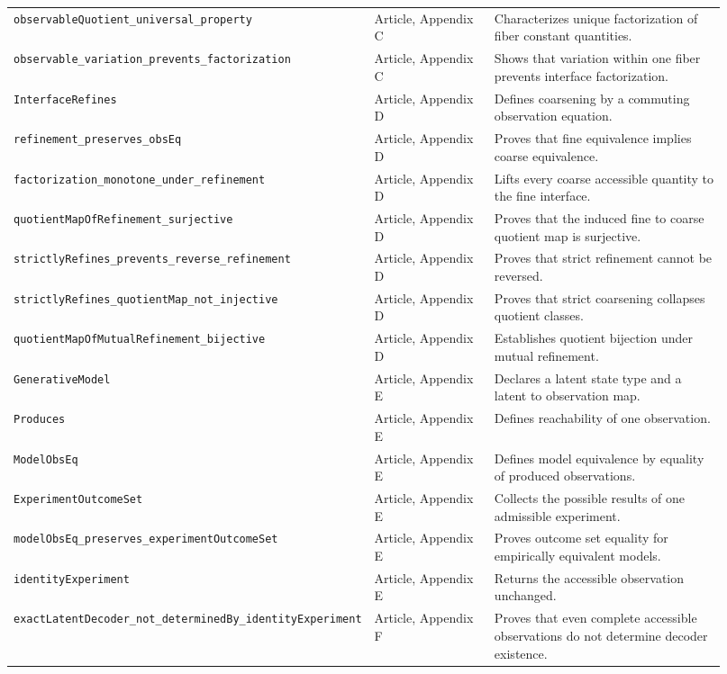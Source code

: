 \begin{landscape}
\begin{longtable}{@{}>{\raggedright\arraybackslash}p{0.31\linewidth}>{\raggedright\arraybackslash}p{0.20\linewidth}>{\raggedright\arraybackslash}p{0.41\linewidth}@{}}
\nolinkurl{observableQuotient_universal_property} & Article, Appendix C & Characterizes unique factorization of fiber constant quantities. \\
\nolinkurl{observable_variation_prevents_factorization} & Article, Appendix C & Shows that variation within one fiber prevents interface factorization. \\
\nolinkurl{InterfaceRefines} & Article, Appendix D & Defines coarsening by a commuting observation equation. \\
\nolinkurl{refinement_preserves_obsEq} & Article, Appendix D & Proves that fine equivalence implies coarse equivalence. \\
\nolinkurl{factorization_monotone_under_refinement} & Article, Appendix D & Lifts every coarse accessible quantity to the fine interface. \\
\nolinkurl{quotientMapOfRefinement_surjective} & Article, Appendix D & Proves that the induced fine to coarse quotient map is surjective. \\
\nolinkurl{strictlyRefines_prevents_reverse_refinement} & Article, Appendix D & Proves that strict refinement cannot be reversed. \\
\nolinkurl{strictlyRefines_quotientMap_not_injective} & Article, Appendix D & Proves that strict coarsening collapses quotient classes. \\
\nolinkurl{quotientMapOfMutualRefinement_bijective} & Article, Appendix D & Establishes quotient bijection under mutual refinement. \\
\nolinkurl{GenerativeModel} & Article, Appendix E & Declares a latent state type and a latent to observation map. \\
\nolinkurl{Produces} & Article, Appendix E & Defines reachability of one observation. \\
\nolinkurl{ModelObsEq} & Article, Appendix E & Defines model equivalence by equality of produced observations. \\
\nolinkurl{ExperimentOutcomeSet} & Article, Appendix E & Collects the possible results of one admissible experiment. \\
\nolinkurl{modelObsEq_preserves_experimentOutcomeSet} & Article, Appendix E & Proves outcome set equality for empirically equivalent models. \\
\nolinkurl{identityExperiment} & Article, Appendix E & Returns the accessible observation unchanged. \\
\nolinkurl{exactLatentDecoder_not_determinedBy_identityExperiment} & Article, Appendix F & Proves that even complete accessible observations do not determine decoder existence. \\

\end{longtable}
\end{landscape}
